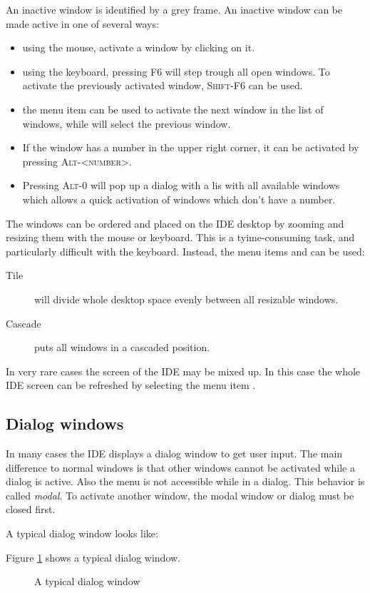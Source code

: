 An inactive window is identified by a grey frame. An inactive window can
be made active in one of several ways:
\begin{itemize}
\item using the mouse, activate a window by clicking on it.
\item using the keyboard, pressing \textsc{F6} will step trough all open 
windows. To activate the previously activated window, \textsc{Shift-F6} can
be used.
\item the menu item  can be used to activate the next 
window in the list of windows, while  will select
the previous window.
\item If the window has a number in the upper right corner, it can be
activated by pressing \textsc{Alt-<number>}.
\item Pressing \textsc{Alt-0} will pop up a dialog with a lis  with all 
available windows which allows a quick activation of windows which 
don't have a number.
\end{itemize}

The windows can be ordered and placed on the IDE desktop by zooming and
resizing them with the mouse or keyboard. This is a tyime-consuming task, 
and particularly difficult with the keyboard. Instead, the menu items
 and  can be used:
\begin{description}
\item[Tile] will divide whole desktop space evenly between all resizable 
windows. 
\item[Cascade] puts all windows in a cascaded position. 
\end{description}

In very rare cases the screen of the IDE may be mixed up. In this
case the whole IDE screen can be refreshed by selecting the menu item 
.
%
%
\subsection{Dialog windows}
\label{se:dialogwindow}
In many cases the IDE displays a dialog window to get user input.
The main difference to normal windows is that other windows cannot be
activated while a dialog is active. Also the menu is not accessible while in
a dialog. This behavior is called \emph{modal}. To activate another window, 
the modal window or dialog must be closed first.

\begin{htmlonly}
A typical dialog window looks like:
\end{htmlonly}
\begin{latexonly}
Figure \ref{fig:idedlg} shows a typical dialog window.
\begin{figure}
\caption{A typical dialog window}
\label{fig:idedlg}
\ifpdf
{}
\else
{}
\fi
\end{figure}
\end{latexonly}

